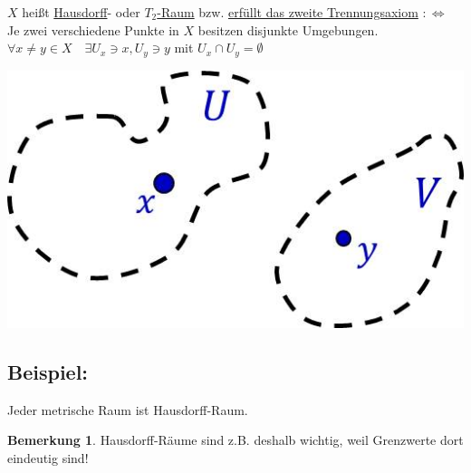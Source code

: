 \documentclass[a4paper,11pt,notitlepage]{report}
\theoremstyle{definition}
\newtheorem{remark}{Bemerkung}[chapter]
\newenvironment{bsp}[1]
{
\setlength{\fboxsep}{10pt}
\subsection*{Beispiel: #1}
\begin{upshape}
}
{
\end{upshape}
}
\newenvironment{definition}[1]{
	\begin{definitions}
	\marginnote{\emph{#1}}
}{\end{definitions}}
\begin{document}
\begin{definition}{$T_2$-Raum}
	$X$ heißt \underline{Hausdorff}- oder \underline{$T_2$-Raum} bzw. \underline{erfüllt das zweite Trennungsaxiom} $:\Leftrightarrow$ Je zwei verschiedene Punkte in $X$ besitzen disjunkte Umgebungen.
	\newline
	$\forall x \neq y \in X \quad \exists U_x \ni x, U_y \ni y$ mit $U_x \cap U_y = \emptyset$
\begin{center}
\includegraphics[scale=0.4]{images/T2.jpg}
\end{center}

\end{definition}

\begin{bsp}{}
	Jeder metrische Raum ist Hausdorff-Raum.
\end{bsp}

\begin{remark}
Hausdorff-Räume sind z.B. deshalb wichtig, weil Grenzwerte dort eindeutig sind!
\end{remark}
\end{document}
